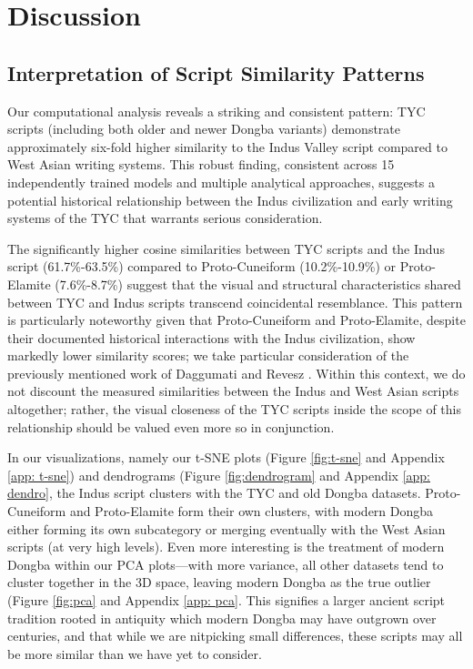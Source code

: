 \documentclass[11pt,a4paper,oneside]{report}
\begin{document}
\chapter{Discussion}
\label{discussion}
\section{Interpretation of Script Similarity Patterns}
\noindent\hspace{1cm}
Our computational analysis reveals a striking and consistent pattern: TYC scripts (including both older and newer Dongba variants) demonstrate approximately six-fold higher similarity to the Indus Valley script compared to West Asian writing systems. This robust finding, consistent across 15 independently trained models and multiple analytical approaches, suggests a potential historical relationship between the Indus civilization and early writing systems of the TYC that warrants serious consideration.

The significantly higher cosine similarities between TYC scripts and the Indus script (61.7\%-63.5\%) compared to Proto-Cuneiform (10.2\%-10.9\%) or Proto-Elamite (7.6\%-8.7\%) suggest that the visual and structural characteristics shared between TYC and Indus scripts transcend coincidental resemblance. This pattern is particularly noteworthy given that Proto-Cuneiform and Proto-Elamite, despite their documented historical interactions with the Indus civilization, show markedly lower similarity scores; we take particular consideration of the previously mentioned work of Daggumati and Revesz \cite{daggumati_convolutional_2023, daggumati_data_2018, daggumati_data_2019}. Within this context, we do not discount the measured similarities between the Indus and West Asian scripts altogether; rather, the visual closeness of the TYC scripts inside the scope of this relationship should be valued even more so in conjunction.

In our visualizations, namely our t-SNE plots (Figure \ref{fig:t-sne} and Appendix \ref{app: t-sne}) and dendrograms (Figure \ref{fig:dendrogram} and Appendix \ref{app: dendro}, the Indus script clusters with the TYC and old Dongba datasets. Proto-Cuneiform and Proto-Elamite form their own clusters, with modern Dongba either forming its own subcategory or merging eventually with the West Asian scripts (at very high levels). Even more interesting is the treatment of modern Dongba within our PCA plots—with more variance, all other datasets tend to cluster together in the 3D space, leaving modern Dongba as the true outlier (Figure \ref{fig:pca} and Appendix \ref{app: pca}. This signifies a larger ancient script tradition rooted in antiquity which modern Dongba may have outgrown over centuries, and that while we are nitpicking small differences, these scripts may all be more similar than we have yet to consider.
\end{document}
